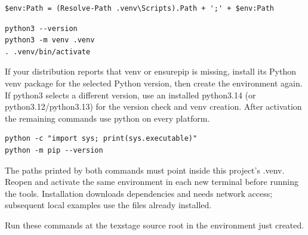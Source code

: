 \documentclass[a4paper,11pt]{article}
\begin{document}
\par\noindent\begin{minipage}{\linewidth}
\begin{Verbatim}
$env:Path = (Resolve-Path .venv\Scripts).Path + ';' + $env:Path
\end{Verbatim}
\end{minipage}\par\smallskip

\par\noindent\begin{minipage}{\linewidth}
\begin{Verbatim}
python3 --version
python3 -m venv .venv
. .venv/bin/activate
\end{Verbatim}
\end{minipage}\par\smallskip

If your distribution reports that venv or ensurepip is missing, install its Python venv package for the selected Python version, then create the environment again.\allowbreak{} If python3 selects a different version, use an installed python3.\allowbreak{}14 (or python3.\allowbreak{}12/\allowbreak{}python3.\allowbreak{}13) for the version check and venv creation.\allowbreak{} After activation the remaining commands use python on every platform.\par

\par\noindent\begin{minipage}{\linewidth}
\begin{Verbatim}
python -c "import sys; print(sys.executable)"
python -m pip --version
\end{Verbatim}
\end{minipage}\par\smallskip

The paths printed by both commands must point inside this project's .\allowbreak{}venv.\allowbreak{} Reopen and activate the same environment in each new terminal before running the tools.\allowbreak{} Installation downloads dependencies and needs network access; subsequent local examples use the files already installed.\par

\label{sec:install-texstage-and-check-the-tools}
Run these commands at the texstage source root in the environment just created.\par
\end{document}
